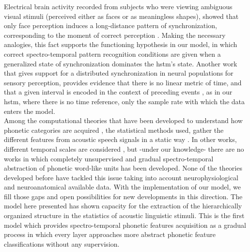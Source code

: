 \documentclass[11pt,a4paper]{article}
\begin{document}
Electrical brain activity recorded from subjects who were viewing ambiguous visual
stimuli (perceived either as faces or as meaningless shapes), showed
that only face perception induces a long-distance pattern of synchronization,
corresponding to the moment of correct perception \cite{rodriguez99}.
Making the necessary analogies, this fact supports the functioning hypothesis in our
model, in which correct spectro-temporal pattern recognition conditions are given
when a generalized state of synchronization dominates the \ac{hstm}'s state.
Another work that gives support for a
distributed synchronization in neural populations for sensory perception,
provides evidence that there is no linear
metric of time, and that a given interval is encoded in the context of preceding
events \cite{karmarkar07}, as in our \ac{hstm}, where there is no time reference,
only the sample rate with which the data enters the model.\\

Among the computational theories that have been developed to understand how
phonetic categories are acquired \cite{rasanen12},
the statistical methods used, gather the different features from
acoustic speech signals in a static way \cite{boer03, vallabha07, toscano10, kouki10}.
In other works, different temporal scales are considered \cite{kouki11},
but -under our knowledge- there are no works in which completely unsupervised and gradual
spectro-temporal abstraction of phonetic word-like units has been developed.
None of the theories developed before have tackled this issue taking into account
neurophysiological and neuroanatomical available data.
With the implementation of our model, we fill those gaps and open
possibilities for new developments in this direction.
The model here presented has shown capacity for the extraction of
the hierarchically organized structure in the statistics of acoustic
linguistic stimuli.
This is the first model which provides spectro-temporal phonetic
features acquisition as a gradual process in which every layer
approaches more abstract phonetic feature classifications without
any supervision.\\
\end{document}
